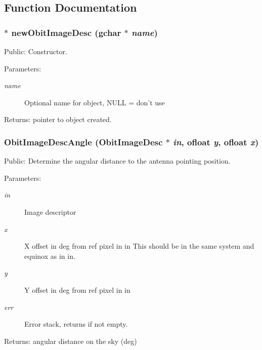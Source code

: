 \subsection{Function Documentation}
\subsubsection{$\ast$ new\-Obit\-Image\-Desc (gchar $\ast$ {\em name})}\label{ObitImageDesc_8h_a10}


Public: Constructor. 

\begin{Desc}
\item[Parameters:]
\begin{description}
\item[{\em name}]Optional name for object, NULL = don't use \end{description}
\end{Desc}
\begin{Desc}
\item[Returns:]pointer to object created. \end{Desc}
\subsubsection{ Obit\-Image\-Desc\-Angle ({\bf Obit\-Image\-Desc} $\ast$ {\em in}, {\bf ofloat} {\em y}, {\bf ofloat} {\em x})}\label{ObitImageDesc_8h_a23}


Public: Determine the angular distance to the antenna pointing position. 

\begin{Desc}
\item[Parameters:]
\begin{description}
\item[{\em in}]Image descriptor \item[{\em x}]X offset in deg from ref pixel in in This should be in the same system and equinox as in in. \item[{\em y}]Y offset in deg from ref pixel in in \item[{\em err}]Error stack, returns if not empty. \end{description}
\end{Desc}
\begin{Desc}
\item[Returns:]angular distance on the sky (deg) \end{Desc}
